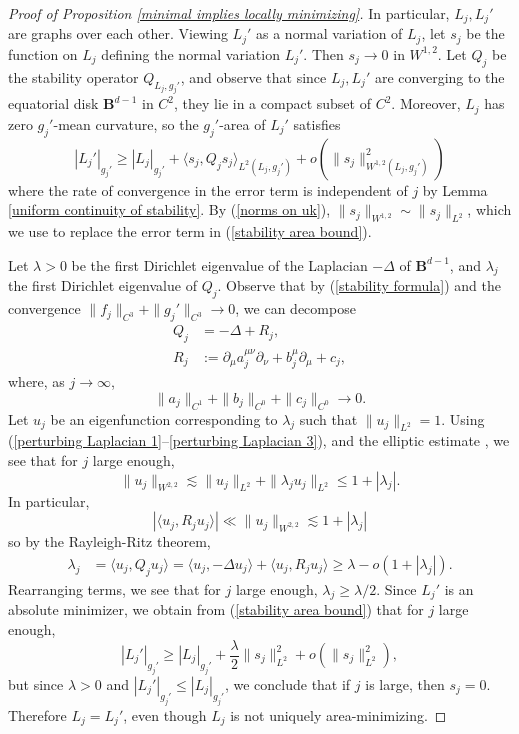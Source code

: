 \documentclass[reqno,11pt]{amsart}
\newcommand{\Ball}{\mathbf{B}}
\theoremstyle{definition}
\numberwithin{equation}{section}
\begin{document}
\begin{proof}[Proof of Proposition \ref{minimal implies locally minimizing}]
In particular, $L_j, L_j'$ are graphs over each other.
Viewing $L_j'$ as a normal variation of $L_j$, let $s_j$ be the function on $L_j$ defining the normal variation $L_j'$.
Then $s_j \to 0$ in $W^{1, 2}$.
Let $Q_j$ be the stability operator $Q_{L_j, g_j'}$, and observe that since $L_j, L_j'$ are converging to the equatorial disk $\Ball^{d - 1}$ in $C^2$, they lie in a compact subset of $C^2$. 
Moreover, $L_j$ has zero $g_j'$-mean curvature, so the $g_j'$-area of $L_j'$ satisfies
\begin{equation}\label{stability area bound}
|L_j'|_{g_j'} \geq |L_j|_{g_j'} + \langle s_j, Q_j s_j\rangle_{L^2(L_j, g_j')} + o(\|s_j\|_{W^{1, 2}(L_j, g_j')}^2)
\end{equation}
where the rate of convergence in the error term is independent of $j$ by Lemma \ref{uniform continuity of stability}.
By (\ref{norms on uk}), $\|s_j\|_{W^{1, 2}} \sim \|s_j\|_{L^2}$, which we use to replace the error term in (\ref{stability area bound}).

Let $\lambda > 0$ be the first Dirichlet eigenvalue of the Laplacian $-\Delta$ of $\Ball^{d - 1}$, and $\lambda_j$ the first Dirichlet eigenvalue of $Q_j$.
Observe that by (\ref{stability formula}) and the convergence $\|f_j\|_{C^3} + \|g_j'\|_{C^3} \to 0$, we can decompose 
\begin{align}
Q_j &= -\Delta + R_j, \label{perturbing Laplacian 1}\\
R_j &:= \partial_\mu a_j^{\mu \nu} \partial_\nu + b_j^\mu \partial_\mu + c_j, \label{perturbing Laplacian 2}
\end{align}
where, as $j \to \infty$,
\begin{equation}
\|a_j\|_{C^1} + \|b_j\|_{C^0} + \|c_j\|_{C^0} \to 0. \label{perturbing Laplacian 3}
\end{equation}
Let $u_j$ be an eigenfunction corresponding to $\lambda_j$ such that $\|u_j\|_{L^2} = 1$.
Using (\ref{perturbing Laplacian 1}--\ref{perturbing Laplacian 3}), and the elliptic estimate \cite[Theorem 8.12]{gilbarg2015elliptic}, we see that for $j$ large enough, 
$$\|u_j\|_{W^{2, 2}} \lesssim \|u_j\|_{L^2} + \|\lambda_j u_j\|_{L^2} \leq 1 + |\lambda_j|.$$
In particular,
$$|\langle u_j, R_j u_j\rangle| \ll \|u_j\|_{W^{2, 2}} \lesssim 1 + |\lambda_j|$$
so by the Rayleigh-Ritz theorem,
\begin{align*}
\lambda_j 
&= \langle u_j, Q_j u_j\rangle 
= \langle u_j, -\Delta u_j\rangle + \langle u_j, R_j u_j\rangle 
\geq \lambda - o(1 + |\lambda_j|).
\end{align*}
Rearranging terms, we see that for $j$ large enough, $\lambda_j \geq \lambda/2$.
Since $L_j'$ is an absolute minimizer, we obtain from (\ref{stability area bound}) that for $j$ large enough,
$$|L_j'|_{g_j'} \geq |L_j|_{g_j'} + \frac{\lambda}{2} \|s_j\|_{L^2}^2 + o(\|s_j\|_{L^2}^2),$$
but since $\lambda > 0$ and $|L_j'|_{g_j'} \leq |L_j|_{g_j'}$, we conclude that if $j$ is large, then $s_j = 0$.
Therefore $L_j = L_j'$, even though $L_j$ is not uniquely area-minimizing.
\end{proof}

\printbibliography
\end{document}

